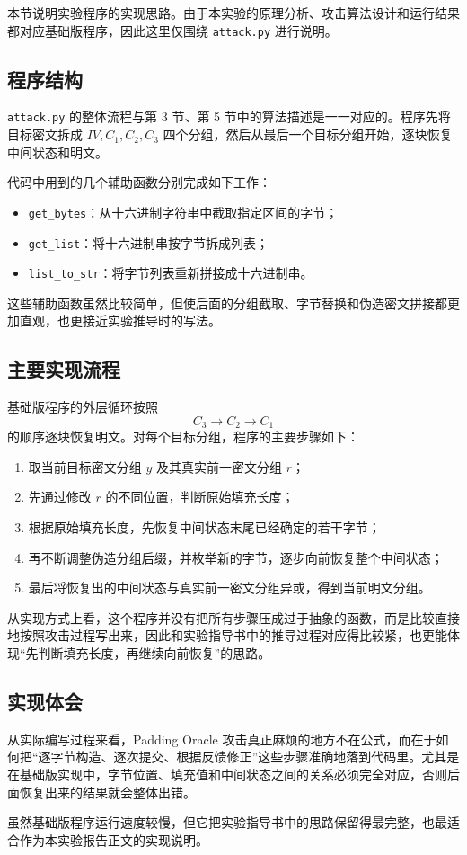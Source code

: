 本节说明实验程序的实现思路。由于本实验的原理分析、攻击算法设计和运行结果都对应基础版程序，因此这里仅围绕 \verb|attack.py| 进行说明。

\subsection{程序结构}

\verb|attack.py| 的整体流程与第 3 节、第 5 节中的算法描述是一一对应的。程序先将目标密文拆成 $IV,C_1,C_2,C_3$ 四个分组，然后从最后一个目标分组开始，逐块恢复中间状态和明文。

代码中用到的几个辅助函数分别完成如下工作：
\begin{itemize}
    \item \verb|get_bytes|：从十六进制字符串中截取指定区间的字节；
    \item \verb|get_list|：将十六进制串按字节拆成列表；
    \item \verb|list_to_str|：将字节列表重新拼接成十六进制串。
\end{itemize}

这些辅助函数虽然比较简单，但使后面的分组截取、字节替换和伪造密文拼接都更加直观，也更接近实验推导时的写法。

\subsection{主要实现流程}

基础版程序的外层循环按照
\[
    C_3 \rightarrow C_2 \rightarrow C_1
\]
的顺序逐块恢复明文。对每个目标分组，程序的主要步骤如下：

\begin{enumerate}
    \item 取当前目标密文分组 $y$ 及其真实前一密文分组 $r$；
    \item 先通过修改 $r$ 的不同位置，判断原始填充长度；
    \item 根据原始填充长度，先恢复中间状态末尾已经确定的若干字节；
    \item 再不断调整伪造分组后缀，并枚举新的字节，逐步向前恢复整个中间状态；
    \item 最后将恢复出的中间状态与真实前一密文分组异或，得到当前明文分组。
\end{enumerate}

从实现方式上看，这个程序并没有把所有步骤压成过于抽象的函数，而是比较直接地按照攻击过程写出来，因此和实验指导书中的推导过程对应得比较紧，也更能体现“先判断填充长度，再继续向前恢复”的思路。

\subsection{实现体会}

从实际编写过程来看，Padding Oracle 攻击真正麻烦的地方不在公式，而在于如何把“逐字节构造、逐次提交、根据反馈修正”这些步骤准确地落到代码里。尤其是在基础版实现中，字节位置、填充值和中间状态之间的关系必须完全对应，否则后面恢复出来的结果就会整体出错。

虽然基础版程序运行速度较慢，但它把实验指导书中的思路保留得最完整，也最适合作为本实验报告正文的实现说明。
